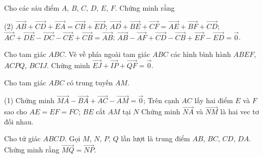 \begin{bt}
	Cho các sáu điểm $A$, $B$, $C$, $D$, $E$, $F$. Chứng minh rằng
	\begin{tasks}(2)
		\task $\overrightarrow{AB}+\overrightarrow{CD}+\overrightarrow{EA}=\overrightarrow{CB}+\overrightarrow{ED}$; 
		\task $\overrightarrow{AD}+\overrightarrow{BE}+\overrightarrow{CF}=\overrightarrow{AE}+\overrightarrow{BF}+\overrightarrow{CD}$;
		\task $\overrightarrow{AC}+\overrightarrow{DE}-\overrightarrow{DC}-\overrightarrow{CE}+\overrightarrow{CB}=\overrightarrow{AB}$; 
		\task 	$\overrightarrow{AB}-\overrightarrow{AF}+\overrightarrow{CD}-\overrightarrow{CB}+\overrightarrow{EF}-\overrightarrow{ED}=\overrightarrow{0}$.
	\end{tasks}
\end{bt}

\begin{bt}
	Cho tam giác $ABC$. Vẽ về phía ngoài tam giác $ABC$ các hình bình hành $ABEF$, $ACPQ$, $BCIJ$. Chứng minh $\overrightarrow{EJ}+\overrightarrow{IP}+\overrightarrow{QF}=\overrightarrow{0}$.
\end{bt}

\begin{bt}
	Cho tam giác $ABC$ có trung tuyến $AM$.
	\begin{tasks}(1)
		\task Chứng minh $\overrightarrow{MA}-\overrightarrow{BA}+\overrightarrow{AC}-\overrightarrow{AM}=\overrightarrow{0}$;
		\task Trên cạnh $AC$ lấy hai điểm $E$ và $F$ sao cho $AE=EF=FC$; $BE$ cắt $AM$ tại $N$ Chứng minh $\overrightarrow{NA}$ và $\overrightarrow{NM}$ là hai vec tơ đối nhau.
	\end{tasks}
\end{bt}

\begin{bt}
	Cho tứ giác $ABCD$. Gọi  $M$, $N$, $P$, $Q$ lần lượt là trung điểm $AB$, $BC$, $CD$, $DA$. Chứng minh rằng $\overrightarrow{MQ}=\overrightarrow{NP}$.
\end{bt}

